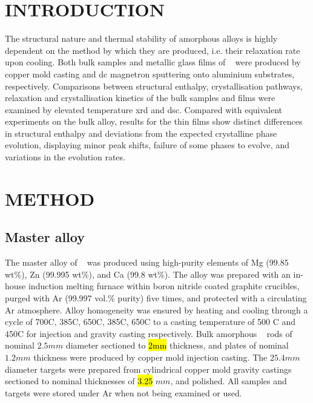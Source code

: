 \documentclass[draft,a4paper,12pt,oneside]{article}%
\begin{document}
\newpage
{}
\tableofcontents\newpage
\clearpage %


\section{INTRODUCTION}
\glsresetall

The structural nature and thermal stability of amorphous alloys is highly dependent on the method by which they are produced, i.e. their relaxation rate upon cooling.  Both bulk samples and metallic glass films of \MgZnCa~ were produced by copper mold casting and \gls{dc} magnetron sputtering onto aluminium substrates, respectively. Comparisons between structural enthalpy, crystallisation pathways, relaxation and crystallisation kinetics of the bulk samples and films were examined by elevated temperature \acrshort{xrd} and \acrshort{dsc}. Compared with equivalent experiments on the bulk alloy, results for the thin films show distinct differences in structural enthalpy and deviations from the expected crystalline phase evolution, displaying minor peak shifts, failure of some phases to evolve, and variations in the evolution rates. 


\section{METHOD}

\subsection{Master alloy}
The master alloy of \MgZnCa~ was produced using high-purity elements of Mg (99.85 wt\%), Zn (99.995 wt\%), and Ca (99.8 wt\%). The alloy was prepared with an in-house induction melting furnace within boron nitride coated graphite crucibles, purged with Ar (99.997 vol.\% purity) five times, and protected with a circulating Ar atmosphere. Alloy homogeneity was ensured by heating and cooling through a cycle of 700\degree C, 385\degree C, 650\degree C, 385\degree C, 650\degree C to a casting temperature of 500 \degree C and 450\degree C for injection and gravity casting respectively. Bulk amorphous \MgZnCa~ rods of nominal $2.5 mm$ diameter sectioned to \hl{2mm} thickness, and plates of nominal $1.2 mm$ thickness were produced by copper mold injection casting. The $25.4 mm$ diameter targets were prepared from cylindrical copper mold gravity castings sectioned to nominal thicknesses of \hl{3.25} $mm$, and polished. All samples and targets were stored under Ar when not being examined or used. 
\end{document}

